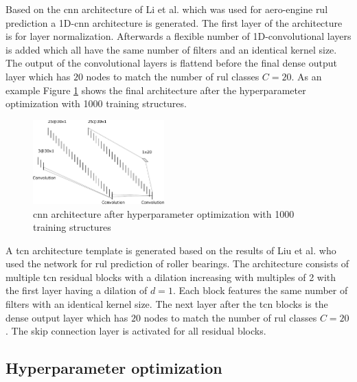 \documentclass[conference]{IEEEtran}
\begin{document}
Based on the \gls{cnn} architecture of Li et al. \cite{Li2018} which was used for aero-engine \gls{rul} prediction a 1D-\gls{cnn} architecture is generated. The first layer of the architecture is for layer normalization. Afterwards a flexible number of 1D-convolutional layers is added which all have the same number of filters and an identical kernel size. The output of the convolutional layers is flattend before the final dense output layer which has $ 20 $ nodes to match the number of \gls{rul} classes $ C = 20 $. As an example Figure \ref{fig:cnn_architecture_1000_structures} shows the final architecture after the hyperparameter optimization with 1000 training structures.

\begin{figure}[htp]
	\centering
	\includegraphics[width=0.45\textwidth]{cnn_architecture_1000_structures.pdf}
	\caption{\gls{cnn} architecture after hyperparameter optimization with 1000 training structures}
	\label{fig:cnn_architecture_1000_structures}
\end{figure}

A \gls{tcn} architecture template is generated based on the results of Liu et al. \cite{Liu2019} who used the network for \gls{rul} prediction of roller bearings. The architecture consists of multiple \gls{tcn} residual blocks with a dilation increasing with multiples of 2 with the first layer having a dilation of $ d = 1 $. Each block features the same number of filters with an identical kernel size. The next layer after the \gls{tcn} blocks is the dense output layer which has $ 20 $ nodes to match the number of \gls{rul} classes $ C = 20 $. The skip connection layer is activated for all residual blocks.


\subsection{Hyperparameter optimization}
\label{sec:hyperparameter_optimization_results}
\end{document}
